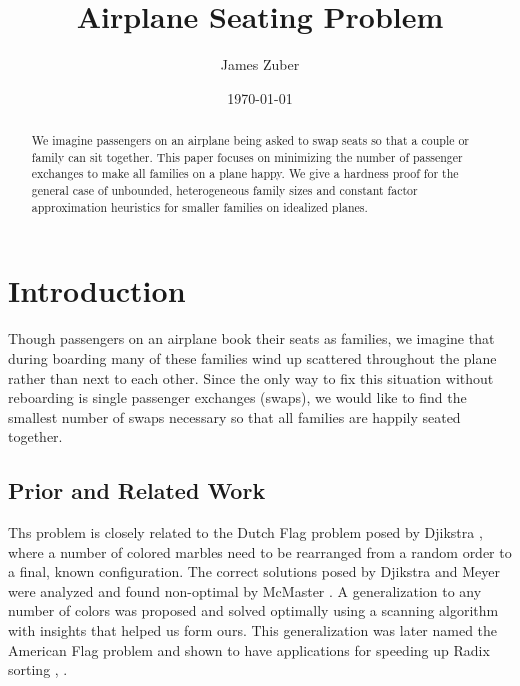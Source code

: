 
\usepackage{mystyle}

\title{Airplane Seating Problem}
\author{James Zuber}
\date{\today}



\maketitle

\begin{abstract}
We imagine passengers on an airplane being asked to swap seats so that a couple or family can sit together.  This paper focuses on minimizing the number of passenger exchanges to make all families on a plane happy.  We give a hardness proof for the general case of unbounded, heterogeneous family sizes and constant factor approximation heuristics for smaller families on idealized planes.
\end{abstract}

\section{Introduction}
Though passengers on an airplane book their seats as families, we imagine that during boarding many of these families wind up scattered throughout the plane rather than next to each other.  Since the only way to fix this situation without reboarding is single passenger exchanges (swaps), we would like to find the smallest number of swaps necessary so that all families are happily seated together.

\subsection{Prior and Related Work}

Ths problem is closely related to the Dutch Flag problem posed by Djikstra \cite{dijkstra1976discipline}, where a number of colored marbles need to be rearranged from a random order to a final, known configuration.  The correct solutions posed by Djikstra and Meyer were analyzed and found non-optimal by McMaster \cite{mcMaster1978analysis}.  A generalization to any number of colors was proposed and solved optimally \cite{bitner1982asymptotically} using a scanning algorithm with insights that helped us form ours.  This generalization was later named the American Flag problem and shown to have applications for speeding up Radix sorting \cite{mcllroy1993engineering}, \cite{al2005formulation}.

